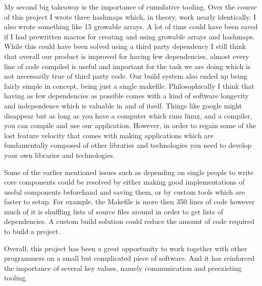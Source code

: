 \documentclass{report}
\begin{document}
My second big takeaway is the importance of cumulative tooling. Over the course of this
project I wrote three hashmaps which, in theory, work nearly identically. I also wrote
something like 15 growable arrays. A lot of time could have been saved if I had
prewritten macros for creating and using growable arrays and hashmaps. While this could
have been solved using a third party dependency I still think that
overall our product is improved for having few dependencies, almost every line of code
compiled is useful and important for the task we are doing which is not necessarily true
of third party code. Our build system also ended up being fairly simple in concept,
being just a single makefile. Philosophically I think that having as few dependencies
as possible comes with a kind of software longevity and independence which is valuable
in and of itself. Things like google might disappear but as long as you have a computer
which runs linux, and a compiler, you can compile and use our application. However,
in order to regain some of the lost feature velocity that comes with making applications
which are fundamentally composed of other libraries and technologies you need to develop
your own libraries and technologies.

Some of the earlier mentioned issues such as depending on single people to write core
components could be resolved by either making good implementations of useful components
beforehand and saving them, or by custom tools which are faster to setup. For example,
the Makefile is more then 350 lines of code however much of it is shuffling lists of source
files around in order to get lists of dependencies. A custom build solution could reduce
the amount of code required to build a project.

Overall, this project has been a great opportunity to work together with other programmers on
a small but complicated piece of software. And it has reinforced the importance of several
key values, namely communication and preexisting tooling.
\end{document}
